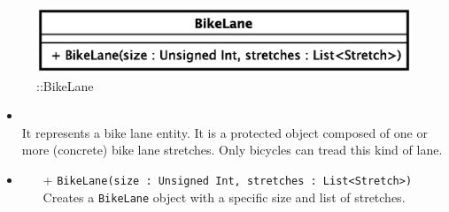 \begin{figure}[h]
\centering
\includegraphics[scale=0.6,keepaspectratio]{images/solution/app/backend/bike_lane.eps}
\caption{\pReactiveComponentLane::BikeLane}
\label{fig:sd-app-bike_lane}
\end{figure}
\FloatBarrier
\begin{itemize}
  \item \textbf{\descr} \\
    It represents a bike lane entity. It is a protected object composed of
    one or more (concrete) bike lane stretches. Only bicycles can tread this
    kind of lane.
  \item \textbf{\ops}
  \begin{itemize}
  \item[+] \texttt{BikeLane(size : Unsigned Int, stretches : List<Stretch>)} \\
  Creates a \texttt{BikeLane} object with a specific size and list of stretches.
  \end{itemize} 
\end{itemize}
